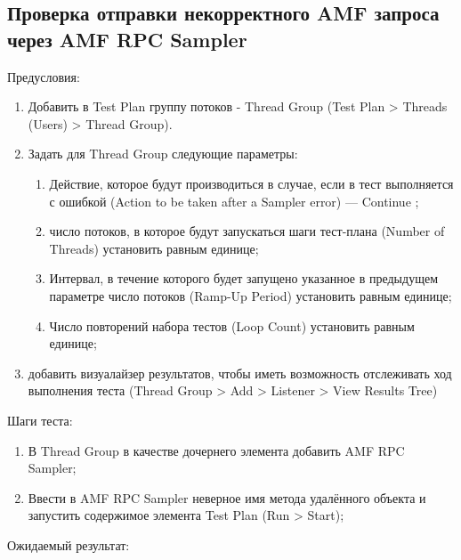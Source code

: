 \subsection{Проверка отправки некорректного AMF запроса через AMF RPC Sampler}

Предусловия:

\begin{enumerate}
\item Добавить в Test Plan группу потоков - Thread Group (Test Plan > Threads (Users) > Thread Group).
\item Задать для Thread Group следующие параметры:

\begin{enumerate}
\item Действие, которое будут производиться в случае, если в тест выполняется с ошибкой
(Action to be taken after a Sampler error) --- Continue ;
\item число потоков, в которое будут запускаться шаги тест-плана (Number of Threads) установить равным единице;
\item Интервал, в течение которого будет запущено указанное в предыдущем параметре
число потоков (Ramp-Up Period) установить равным единице;
\item Число повторений набора тестов (Loop Count) установить равным единице;
\end{enumerate}

\item добавить визуалайзер результатов, чтобы иметь возможность отслеживать ход выполнения теста (Thread Group >
Add > Listener > View Results Tree)
\end{enumerate}

Шаги теста:

\begin{enumerate}
\item В Thread Group в качестве дочернего элемента добавить AMF RPC Sampler;
\item Ввести в AMF RPC Sampler неверное имя метода удалённого объекта и запустить содержимое элемента Test Plan (Run > Start);
\end{enumerate}

Ожидаемый результат:

